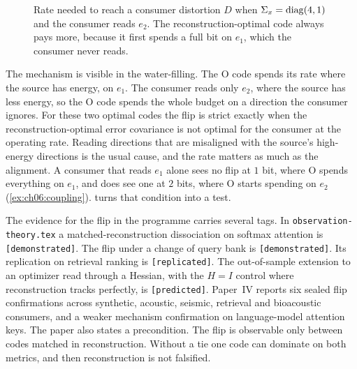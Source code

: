 \begin{figure}[tbp]\centering
{}
\caption{Rate needed to reach a consumer distortion $D$ when $\Sigma_x=\operatorname{diag}(4,1)$ and the consumer reads $e_2$. The reconstruction-optimal code always pays more, because it first spends a full bit on $e_1$, which the consumer never reads.}
\label{fig:ch06:ratecurves}
\end{figure}

The mechanism is visible in the water-filling. The O code spends its rate where the source has energy, on $e_1$. The consumer reads only $e_2$, where the source has less energy, so the O code spends the whole budget on a direction the consumer ignores. For these two optimal codes the flip is strict exactly when the reconstruction-optimal error covariance is not optimal for the consumer at the operating rate. Reading directions that are misaligned with the source's high-energy directions is the usual cause, and the rate matters as much as the alignment. A consumer that reads $e_1$ alone sees no flip at $1$ bit, where O spends everything on $e_1$, and does see one at $2$ bits, where O starts spending on $e_2$ (\cref{ex:ch06:coupling}).  turns that condition into a test.

The evidence for the flip in the programme carries several tags. In \texttt{observation-theory.tex} a matched-reconstruction dissociation on softmax attention is \texttt{[demonstrated]}. The flip under a change of query bank is \texttt{[demonstrated]}. Its replication on retrieval ranking is \texttt{[replicated]}. The out-of-sample extension to an optimizer read through a Hessian, with the $H=I$ control where reconstruction tracks perfectly, is \texttt{[predicted]}. Paper~IV reports six sealed flip confirmations across synthetic, acoustic, seismic, retrieval and bioacoustic consumers, and a weaker mechanism confirmation on language-model attention keys. The paper also states a precondition. The flip is observable only between codes matched in reconstruction. Without a tie one code can dominate on both metrics, and then reconstruction is not falsified.

